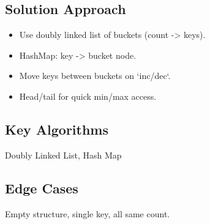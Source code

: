 \documentclass[10pt, a4paper]{article}
\begin{document}
\subsection*{Solution Approach}
\begin{itemize}
    \item Use doubly linked list of buckets (count -> keys).
    \item HashMap: key -> bucket node.
    \item Move keys between buckets on `inc/dec`.
    \item Head/tail for quick min/max access.
\end{itemize}

\subsection*{Key Algorithms}
Doubly Linked List, Hash Map

\subsection*{Edge Cases}
Empty structure, single key, all same count.
\end{document}
